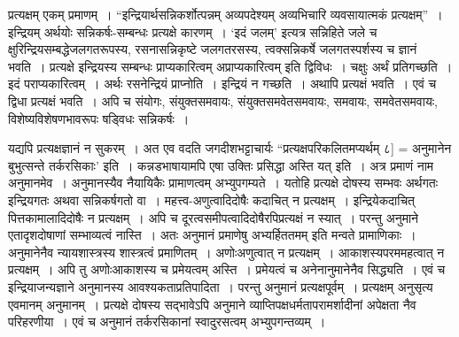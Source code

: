 {प्रत्यक्षम् एकम् प्रमाणम्~। “इन्द्रियार्थसन्निकर्शोत्पन्नम् अव्यपदेश्यम् अव्यभिचारि व्यवसायात्मकं प्रत्यक्षम्”~। इन्द्रियम् अर्थयोः सन्निकर्षः-सम्बन्धः प्रत्यक्षे कारणम्~। ‘इदं जलम्’ इत्यत्र सन्निहिते जले च क्षुरिन्द्रियसम्बद्धेजलगतरूपस्य, रसनासन्निकृष्टे जलगतरसस्य, त्वक्सन्निकर्षे जलगतस्पर्शस्य च ज्ञानं भवति~। प्रत्यक्षे इन्द्रियस्य सम्बन्धः प्राप्यकारित्वम् अप्राप्यकारित्वम् इति द्विविधः~। चक्षुः अर्थं प्रतिगच्छति~। इदं पराप्यकारित्वम्~। अर्थः रसनेन्द्रियं प्राप्नोति~। इन्द्रियं न गच्छति~। अथापि प्रत्यक्षं भवति~। एवं च द्विधा प्रत्यक्षं भवति~। अपि च संयोगः, संयुक्तसमवायः, संयुक्तसमवेतसमवायः, समवायः, समवेतसमवायः, विशेष्यविशेषणभावरूपः षड्विधः सन्निकर्षः~। 

यद्यपि प्रत्यक्षज्ञानं न सुकरम्~। अत एव वदति जगदीशभट्टाचार्यः “प्रत्यक्षपरिकलितमप्यर्थम् ८] = अनुमानेन बुभुत्सन्ते तर्करसिकाः’ इति~। कन्नडभाषायामपि एषा उक्तिः प्रसिद्धा अस्ति यत्  इति~। अत्र प्रमाणं नाम अनुमानमेव~। अनुमानस्यैव नैयायिकैः प्रामाणत्वम् अभ्युपगम्यते~। यतोहि प्रत्यक्षे दोषस्य सम्भवः अर्थगतः इन्द्रियगतः अथवा सन्निकर्षगतो वा~। महत्त्व-अणुत्वादिदोषैः कदाचित् न प्रत्यक्षम्~। इन्द्रियेकदाचित् पित्तकामालादिदोषैः न प्रत्यक्षम्~। अपि च दूरत्वसमीपत्वादिदोषैरपिप्रत्यक्षं न स्यात्~। परन्तु अनुमाने एतादृशदोषाणां सम्भाव्यत्वं नास्ति~। अतः अनुमानं प्रमाणेषु अभ्यर्हिततमम् इति मन्वते प्रामाणिकाः~। अनुमानेनैव न्यायशास्त्रस्य शास्त्रत्वं प्रमाणितम्~। अणोःअणुत्वात् न प्रत्यक्षम्~। आकाशस्यपरममहत्वात् न प्रत्यक्षम्~। अपि तु अणोःआकाशस्य च प्रमेयत्वम् अस्ति~। प्रमेयत्वं च अनेनानुमानेनैव सिद्ध्यति~। एवं च इन्द्रियाजन्यज्ञाने अनुमानस्य आवश्यकताप्रतिपादिता~। परन्तु अनुमानं प्रत्यक्षपूर्वम्~। प्रत्यक्षम् अनुसृत्य एवमानम् अनुमानम्~। प्रत्यक्षे दोषस्य सद्भावेऽपि अनुमाने व्याप्तिपक्षधर्मतापरामर्शादीनां अपेक्षता नैव परिहरणीया~। एवं च अनुमानं तर्करसिकानां स्वादुरसत्वम् अभ्युपगन्तव्यम्~। 

\articleend
}
